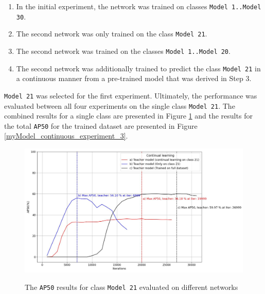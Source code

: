\begin{enumerate}
\item In the initial experiment, the network was trained on classes \texttt{Model 1..Model 30}.
\item The second network was only trained on the class \texttt{Model 21}.
\item The second network was trained on the classes \texttt{Model 1..Model 20}.
\item The second network was additionally trained to predict the class \texttt{Model 21} in a continuous manner from a pre-trained model that was derived in Step 3.
\end{enumerate} 

\texttt{Model 21} was selected for the first experiment. Ultimately, the performance was evaluated between all four experiments on the single class \texttt{Model 21}. The combined results for a single class are presented in Figure  \ref{myModel_continuous_experiment_1} and the results for the total \texttt{AP50} for the trained dataset are presented in Figure \ref{myModel_continuous_experiment_3}.

\begin{figure}[htb]
	\begin{center}
		\includegraphics[width=14cm]{./AP50_continual_21.jpg}
	\end{center}
	\caption{The \texttt{AP50} results for class \texttt{Model 21} evaluated on different networks}
	\begin{center}
		\label{myModel_continuous_experiment_1}
	\end{center}
\end{figure}
\FloatBarrier  

